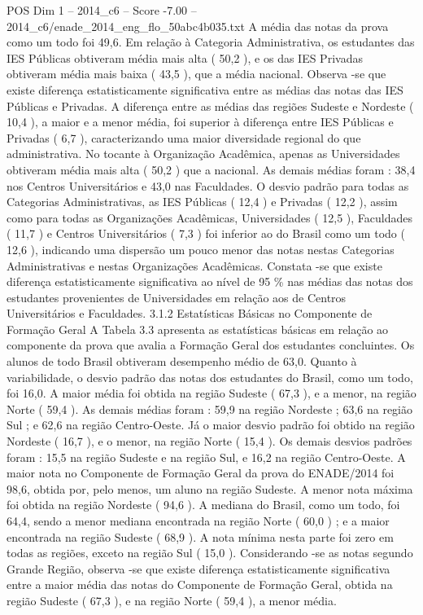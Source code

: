 \begin{textsample}{POS Dim 1 – 2014\_c6 – Score -7.00 – 2014\_c6/enade\_2014\_eng\_flo\_50abc4b035.txt}
A média das notas da prova como um todo foi 49,6.
Em relação à Categoria Administrativa, os estudantes das IES Públicas obtiveram média mais alta ( 50,2 ), e os das IES Privadas obtiveram média mais baixa ( 43,5 ), que a média nacional.
Observa -se que existe diferença estatisticamente significativa entre as médias das notas das IES Públicas e Privadas.
A diferença entre as médias das regiões Sudeste e Nordeste ( 10,4 ), a maior e a menor média, foi superior à diferença entre IES Públicas e Privadas ( 6,7 ), caracterizando uma maior diversidade regional do que administrativa.
No tocante à Organização Acadêmica, apenas as Universidades obtiveram média mais alta ( 50,2 ) que a nacional.
As demais médias foram : 38,4 nos Centros Universitários e 43,0 nas Faculdades.
O desvio padrão para todas as Categorias Administrativas, as IES Públicas ( 12,4 ) e Privadas ( 12,2 ), assim como para todas as Organizações Acadêmicas, Universidades ( 12,5 ), Faculdades ( 11,7 ) e Centros Universitários ( 7,3 ) foi inferior ao do Brasil como um todo ( 12,6 ), indicando uma dispersão um pouco menor das notas nestas Categorias Administrativas e nestas Organizações Acadêmicas.
Constata -se que existe diferença estatisticamente significativa ao nível de 95 \% nas médias das notas dos estudantes provenientes de Universidades em relação aos de Centros Universitários e Faculdades. 3.1.2 Estatísticas Básicas no Componente de Formação Geral A Tabela 3.3 apresenta as estatísticas básicas em relação ao componente da prova que avalia a Formação Geral dos estudantes concluintes.
Os alunos de todo Brasil obtiveram desempenho médio de 63,0.
Quanto à variabilidade, o desvio padrão das notas dos estudantes do Brasil, como um todo, foi 16,0.
A maior média foi obtida na região Sudeste ( 67,3 ), e a menor, na região Norte ( 59,4 ).
As demais médias foram : 59,9 na região Nordeste ; 63,6 na região Sul ; e 62,6 na região Centro-Oeste.
Já o maior desvio padrão foi obtido na região Nordeste ( 16,7 ), e o menor, na região Norte ( 15,4 ).
Os demais desvios padrões foram : 15,5 na região Sudeste e na região Sul, e 16,2 na região Centro-Oeste.
A maior nota no Componente de Formação Geral da prova do ENADE/2014 foi 98,6, obtida por, pelo menos, um aluno na região Sudeste.
A menor nota máxima foi obtida na região Nordeste ( 94,6 ).
A mediana do Brasil, como um todo, foi 64,4, sendo a menor mediana encontrada na região Norte ( 60,0 ) ; e a maior encontrada na região Sudeste ( 68,9 ).
A nota mínima nesta parte foi zero em todas as regiões, exceto na região Sul ( 15,0 ).
Considerando -se as notas segundo Grande Região, observa -se que existe diferença estatisticamente significativa entre a maior média das notas do Componente de Formação Geral, obtida na região Sudeste ( 67,3 ), e na região Norte ( 59,4 ), a menor média.

\end{textsample}

